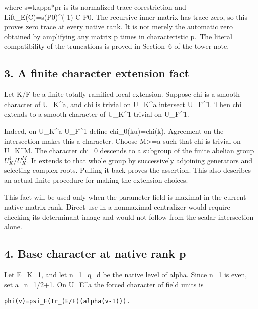 where s=kappa*pr is its normalized trace corestriction and
Lift\_E(C)=s(P0)\^{}(-1) C P0. The recursive inner matrix has trace
zero, so this proves zero trace at every native rank. It is not merely
the automatic zero obtained by amplifying any matrix p times in
characteristic p.~The literal compatibility of the truncations is proved
in Section~6 of the tower note.

\hypertarget{odd_character-a-finite-character-extension-fact}{%
\subsection{3. A finite character extension fact}\label{odd_character-a-finite-character-extension-fact}}

Let K/F be a finite totally ramified local extension. Suppose chi is a
smooth character of U\_K\^{}a, and chi is trivial on U\_K\^{}a intersect
U\_F\^{}1. Then chi extends to a smooth character of U\_K\^{}1 trivial
on U\_F\^{}1.

Indeed, on U\_K\^{}a U\_F\^{}1 define chi\_0(ku)=chi(k). Agreement on
the intersection makes this a character. Choose M\textgreater=a such
that chi is trivial on U\_K\^{}M. The character chi\_0 descends to a
subgroup of the finite abelian group \(U_K^1/U_K^M\). It
extends to that whole group by successively adjoining generators and
selecting complex roots. Pulling it back proves the assertion. This also
describes an actual finite procedure for making the extension choices.

This fact will be used only when the parameter field is maximal in the
current native matrix rank. Direct use in a nonmaximal centralizer would
require checking its determinant image and would not follow from the
scalar intersection alone.

\hypertarget{odd_character-base-character-at-native-rank-p}{%
\subsection{4. Base character at native rank
p}\label{odd_character-base-character-at-native-rank-p}}

Let E=K\_1, and let n\_1=q\_d be the native level of alpha. Since n\_1
is even, set a=n\_1/2+1. On U\_E\^{}a the forced character of field units is

\begin{Verbatim}[fontsize=\small,breaklines=true,breakanywhere=true]
phi(v)=psi_F(Tr_(E/F)(alpha(v-1))).
\end{Verbatim}

